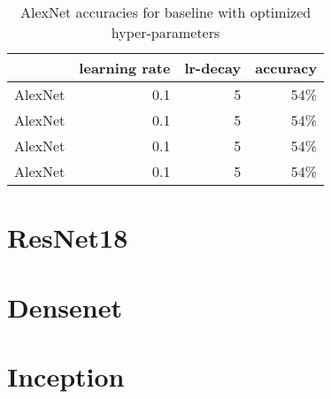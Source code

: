 \begin{table}[t] \centering
{}
\caption{AlexNet accuracies for baseline with optimized hyper-parameters}
\begin{tabular}{@{}rrrr@{}}
\toprule & learning rate & lr-decay & accuracy \\
\midrule
AlexNet		& 0.1 		& 5		& 54\%  \\
AlexNet		& 0.1 		& 5		& 54\%  \\
AlexNet		& 0.1 		& 5		& 54\%  \\
AlexNet		& 0.1 		& 5		& 54\%  \\
\bottomrule
\end{tabular}
\label{tbl:similarity-test-map}
\end{table}

\section{ResNet18}

\section{Densenet}

\section{Inception}


